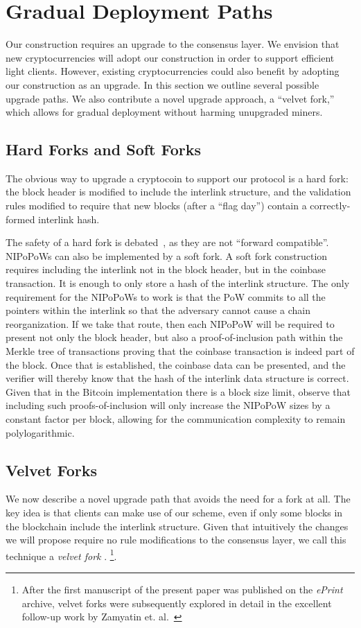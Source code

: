 \section{Gradual Deployment Paths}\label{sec:forks}

Our construction requires an upgrade to the consensus layer. We envision that
new cryptocurrencies will adopt our construction in order to support efficient
light clients. However, existing cryptocurrencies could also benefit by adopting
our construction as an upgrade. In this section we outline several possible
upgrade paths. We also contribute a novel upgrade approach, a ``velvet fork,''
which allows for gradual deployment without harming unupgraded miners.

\subsection{Hard Forks and Soft Forks}
The obvious way to upgrade a cryptocoin to support our protocol is a hard fork:
the block header is modified to include the interlink structure, and the
validation rules modified to require that new blocks (after a ``flag day'')
contain a correctly-formed interlink hash.

The safety of a hard fork is debated~\cite{vitalikforks}, as they are not
``forward compatible''. NIPoPoWs can also be implemented by a soft fork. A soft
fork construction requires including the interlink not in the block header, but
in the coinbase transaction. It is enough to only store a hash of the interlink
structure. The only requirement for the NIPoPoWs to work is that the PoW commits
to all the pointers within the interlink so that the adversary cannot cause a
chain reorganization. If we take that route, then each NIPoPoW will be required
to present not only the block header, but also a proof-of-inclusion path within
the Merkle tree of transactions proving that the coinbase transaction is indeed
part of the block. Once that is established, the coinbase data can be presented,
and the verifier will thereby know that the hash of the interlink data structure
is correct. Given that in the Bitcoin implementation there is a block size
limit, observe that including such proofs-of-inclusion will only increase the
NIPoPoW sizes by a constant factor per block, allowing for the communication
complexity to remain polylogarithmic.

\subsection{Velvet Forks}
We now describe a novel upgrade path that avoids the need for a fork at all. The
key idea is that clients can make use of our scheme, even if only some blocks in
the blockchain include the interlink structure. Given that intuitively the
changes we will propose require no rule modifications to the consensus layer, we call this
technique a \emph{velvet fork}
\ifanonymous
  .
\else
  \footnote{After the first manuscript of the present paper was published on the
  \emph{ePrint} archive, velvet forks were subsequently explored in detail in
  the excellent follow-up work by Zamyatin et. al.~\cite{velvet}}.
\fi

